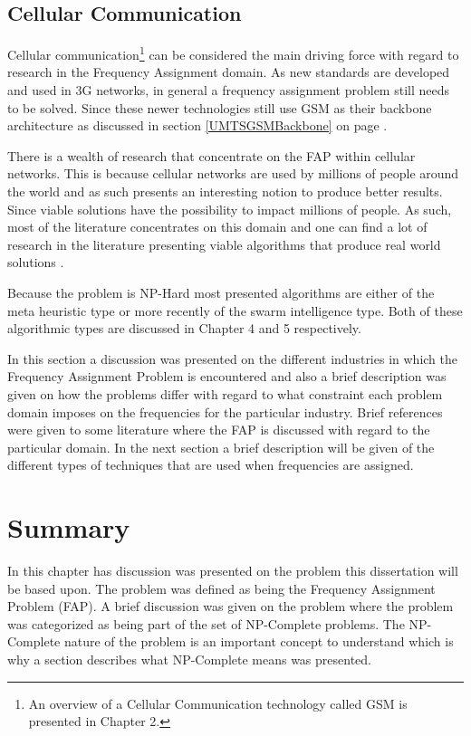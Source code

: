 \subsection{Cellular Communication}
Cellular communication\footnote{An overview of a Cellular Communication technology called GSM is presented in Chapter 2.} can be considered the main driving force with regard to research in the Frequency Assignment domain. As new standards are developed and used in 3G networks, in general a frequency assignment problem still needs to be solved. Since these newer technologies still use GSM as their backbone architecture as discussed in section \ref{UMTSGSMBackbone} on page \pageref{UMTSGSMBackbone}.

There is a wealth of research that concentrate on the FAP within cellular networks. This is because cellular networks are used by millions of people around the world and as such presents an interesting notion to produce better results. Since viable solutions have the possibility to impact millions of people. As such, most of the literature concentrates on this domain and one can find a lot of research in the literature presenting viable algorithms that produce real world solutions \cite{Eisenblatter}. 

Because the problem is NP-Hard most presented algorithms are either of the meta heuristic type or more recently of the swarm intelligence type. Both of these algorithmic types are discussed in Chapter 4 and 5 respectively.

In this section a discussion was presented on the different industries in which the Frequency Assignment Problem is encountered and also a brief description was given on how the problems differ with regard to what constraint each problem domain imposes on the frequencies for the particular industry. 
Brief references were given to some literature where the FAP is discussed with regard to the particular domain. In the next section a brief description will be given of the different types of techniques that are used when frequencies are assigned.
\section{Summary}
In this chapter has discussion was presented on the problem this dissertation will be based upon. The problem was defined as being the Frequency Assignment Problem (FAP). A brief discussion was given on the problem where the problem was categorized as being part of the set of NP-Complete problems. The NP-Complete nature of the problem is an important concept to understand which is why a section describes what NP-Complete means was presented.

